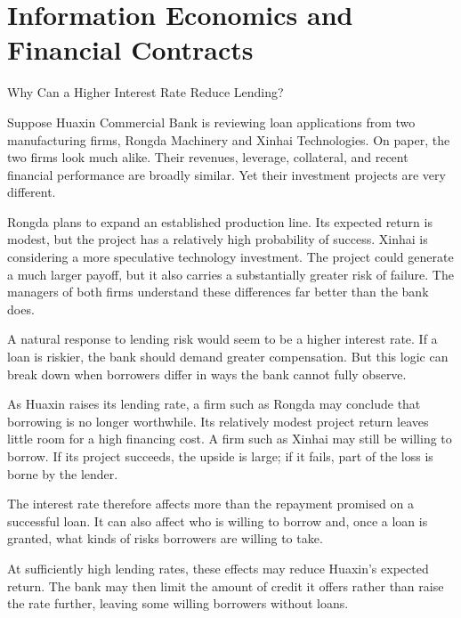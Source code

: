 \chapter{Information Economics and Financial Contracts}
\label{chap:Information_Economics_and_Financial_Contracts}

\begin{openingcase}{Why Can a Higher Interest Rate Reduce Lending?}

Suppose Huaxin Commercial Bank is reviewing loan applications from two manufacturing firms, Rongda Machinery and Xinhai Technologies. On paper, the two firms look much alike. Their revenues, leverage, collateral, and recent financial performance are broadly similar. Yet their investment projects are very different.

Rongda plans to expand an established production line. Its expected return is modest, but the project has a relatively high probability of success. Xinhai is considering a more speculative technology investment. The project could generate a much larger payoff, but it also carries a substantially greater risk of failure. The managers of both firms understand these differences far better than the bank does.

A natural response to lending risk would seem to be a higher interest rate. If a loan is riskier, the bank should demand greater compensation. But this logic can break down when borrowers differ in ways the bank cannot fully observe.

As Huaxin raises its lending rate, a firm such as Rongda may conclude that borrowing is no longer worthwhile. Its relatively modest project return leaves little room for a high financing cost. A firm such as Xinhai may still be willing to borrow. If its project succeeds, the upside is large; if it fails, part of the loss is borne by the lender.

The interest rate therefore affects more than the repayment promised on a successful loan. It can also affect who is willing to borrow and, once a loan is granted, what kinds of risks borrowers are willing to take.

At sufficiently high lending rates, these effects may reduce Huaxin's expected return. The bank may then limit the amount of credit it offers rather than raise the rate further, leaving some willing borrowers without loans.

\end{openingcase}

